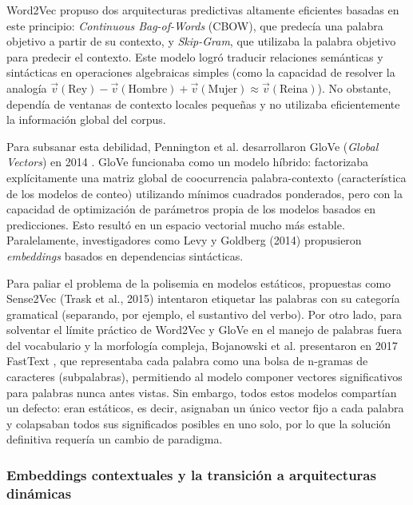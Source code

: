 Word2Vec propuso dos arquitecturas predictivas altamente eficientes basadas en este principio: \textit{Continuous Bag-of-Words} (CBOW), que predecía una palabra objetivo a partir de su contexto, y \textit{Skip-Gram}, que utilizaba la palabra objetivo para predecir el contexto. Este modelo logró traducir relaciones semánticas y sintácticas en operaciones algebraicas simples (como la capacidad de resolver la analogía $\vec{v}(\text{Rey}) - \vec{v}(\text{Hombre}) + \vec{v}(\text{Mujer}) \approx \vec{v}(\text{Reina})$). No obstante, dependía de ventanas de contexto locales pequeñas y no utilizaba eficientemente la información global del corpus.

Para subsanar esta debilidad, Pennington et al. desarrollaron GloVe (\textit{Global Vectors}) en 2014 \cite{pennington_glove_2014}. GloVe funcionaba como un modelo híbrido: factorizaba explícitamente una matriz global de coocurrencia palabra-contexto (característica de los modelos de conteo) utilizando mínimos cuadrados ponderados, pero con la capacidad de optimización de parámetros propia de los modelos basados en predicciones. Esto resultó en un espacio vectorial mucho más estable. Paralelamente, investigadores como Levy y Goldberg (2014) \cite{levy_dependency_2014} propusieron \textit{embeddings} basados en dependencias sintácticas.

Para paliar el problema de la polisemia en modelos estáticos, propuestas como Sense2Vec (Trask et al., 2015) \cite{trask_sense2vec_2015} intentaron etiquetar las palabras con su categoría gramatical (separando, por ejemplo, el sustantivo del verbo). Por otro lado, para solventar el límite práctico de Word2Vec y GloVe en el manejo de palabras fuera del vocabulario y la morfología compleja, Bojanowski et al. presentaron en 2017 FastText \cite{bojanowski_enriching_2017}, que representaba cada palabra como una bolsa de n-gramas de caracteres (subpalabras), permitiendo al modelo componer vectores significativos para palabras nunca antes vistas. Sin embargo, todos estos modelos compartían un defecto: eran estáticos, es decir, asignaban un único vector fijo a cada palabra y colapsaban todos sus significados posibles en uno solo, por lo que la solución definitiva requería un cambio de paradigma.

\subsubsection{Embeddings contextuales y la transición a arquitecturas dinámicas}

